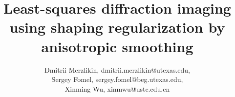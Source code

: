 
\renewcommand{\thefootnote}{\fnsymbol{footnote}}

\title{Least-squares diffraction imaging using shaping regularization by anisotropic smoothing}

\author{Dmitrii Merzlikin\footnotemark[1], dmitrii.merzlikin@utexas.edu, \\
	Sergey Fomel\footnotemark[2], sergey.fomel@beg.utexas.edu, \\
        Xinming Wu\footnotemark[3], xinmwu@ustc.edu.cn}

\address{
\footnotemark[1]Formerly Bureau of Economic Geology \\
John A. and Katherine G. Jackson School of Geosciences \\
The University of Texas at Austin \\
University Station, Box X \\
Austin, Texas 78713-8924, USA; \\
presently WesternGeco \\
Schlumberger \\
3750 Briarpark Drive \\
Houston, Texas 77042, USA\\
E-mail: dmitrii.merzlikin@utexas.edu (corresponding author)
\footnotemark[2]Bureau of Economic Geology \\
John A. and Katherine G. Jackson School of Geosciences \\
The University of Texas at Austin \\
University Station, Box X \\
Austin, Texas 78713-8924, USA \\
\footnotemark[3]Formerly Bureau of Economic Geology \\
John A. and Katherine G. Jackson School of Geosciences \\
The University of Texas at Austin \\
University Station, Box X \\
Austin, Texas 78713-8924, USA; \\
presently School of Earth and Space Sciences \\
University of Science and Technology of China \\
Hefei, China \\
}


\maketitle


